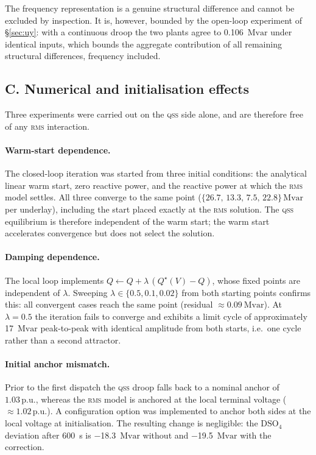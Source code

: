 \documentclass[11pt,a4paper]{article}
\newcommand{\pu}{\ensuremath{\mathrm{p.u.}}}
\newcommand{\Mvar}{\ensuremath{\mathrm{Mvar}}}
\newcommand{\qss}{\textsc{qss}}
\newcommand{\rms}{\textsc{rms}}
\begin{document}
The frequency representation is a genuine structural difference and cannot
be excluded by inspection. It is, however, bounded by the open-loop
experiment of \S\ref{sec:uy}: with a continuous droop the two plants agree
to \SI{0.106}{\Mvar} under identical inputs, which bounds the aggregate
contribution of all remaining structural differences, frequency included.

\subsection{C. Numerical and initialisation effects}

Three experiments were carried out on the \qss{} side alone, and are
therefore free of any \rms{} interaction.

\paragraph{Warm-start dependence.} The closed-loop iteration was started
from three initial conditions: the analytical linear warm start, zero
reactive power, and the reactive power at which the \rms{} model settles.
All three converge to the same point
($\{26.7,\,13.3,\,7.5,\,22.8\}\,\Mvar$ per underlay), including the start
placed exactly at the \rms{} solution. The \qss{} equilibrium is therefore
independent of the warm start; the warm start accelerates convergence but
does not select the solution.

\paragraph{Damping dependence.} The local loop implements
$Q \leftarrow Q + \lambda\,(Q^{\star}(V) - Q)$, whose fixed points are
independent of $\lambda$. Sweeping $\lambda \in \{0.5, 0.1, 0.02\}$ from
both starting points confirms this: all convergent cases reach the same
point (residual $\approx \SI{0.09}{\Mvar}$). At $\lambda = 0.5$ the
iteration fails to converge and exhibits a limit cycle of approximately
\SI{17}{\Mvar} peak-to-peak with identical amplitude from both starts,
i.e.\ one cycle rather than a second attractor.

\paragraph{Initial anchor mismatch.} Prior to the first dispatch the \qss{}
droop falls back to a nominal anchor of $1.03\,\pu$, whereas the \rms{}
model is anchored at the local terminal voltage ($\approx 1.02\,\pu$).
A configuration option was implemented to anchor both sides at the local
voltage at initialisation. The resulting change is negligible: the
$\mathrm{DSO}_4$ deviation after \SI{600}{\second} is \SI{-18.3}{\Mvar}
without and \SI{-19.5}{\Mvar} with the correction.
\end{document}
